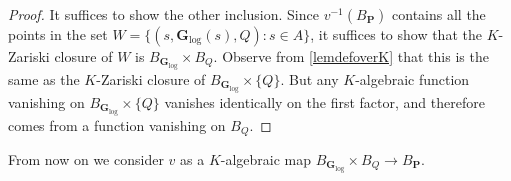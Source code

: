 \documentclass[10pt]{article}
\numberwithin{equation}{section}
\theoremstyle{plain}
\newtheorem{lem}[thm]{Lemma}
\theoremstyle{definition}
\theoremstyle{remark}
\newcommand{\greg}[1]{{\color{blue} \sf   Greg: [#1]}}
\newcommand{\GL}{\operatorname{GL}}
\begin{document}
\begin{proof}
It suffices to show the other inclusion. Since $v^{-1}(B_{\mathbf{P}})$ contains all the points in the set $W = \{(s, \mathbf{G}_{\operatorname{log}}(s), Q) : s \in A \}$, it suffices to show that the $K$-Zariski closure of $W$ is $B_{\mathbf{G}_{\operatorname{log}}} \times B_{Q}$. Observe from \autoref{lemdefoverK} that this is the same as the $K$-Zariski closure of $B_{\mathbf{G}_{\operatorname{log}}} \times \{ Q \}$. But any $K$-algebraic function vanishing on $B_{\mathbf{G}_{\operatorname{log}}} \times \{ Q \}$ vanishes identically on the first factor, and therefore comes from a function vanishing on $B_{Q}$.
\end{proof}
From now on we consider $v$ as a $K$-algebraic map $B_{\mathbf{G}_{\operatorname{log}}} \times B_{Q} \to B_{\mathbf{P}}$. %



%
%



\end{document}

